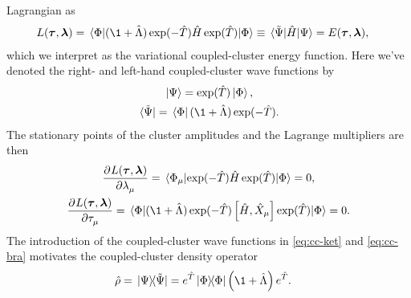             Lagrangian as
            \begin{align}
                L(\vfg{\clustamp}, \vfg{\clustlamp})
                &= \mel*{\slat}{
                    (\1 + \clustl)
                    \exponential(-\clust)
                    \hamil
                    \exponential(\clust)
                }{\slat}
                \equiv \mel*{\tilde{\Psi}}{\hamil}{\Psi}
                = E(\vfg{\clustamp}, \vfg{\clustlamp}),
                \label{eq:cc-energy-functional}
            \end{align}
            which we interpret as the variational coupled-cluster energy
            function.
            Here we've denoted the right- and left-hand coupled-cluster wave
            functions by
            \begin{gather}
                \ket*{\Psi} = \exponential(\clust)\ket{\slat},
                \label{eq:cc-ket}
                \\
                \bra*{\tilde{\Psi}} = \bra*{\slat}(\1 + \clustl)
                \exponential(-\clust).
                \label{eq:cc-bra}
            \end{gather}
            The stationary points of the cluster amplitudes and the Lagrange
            multipliers are then
            \begin{gather}
                \dpd[]{L(\vfg{\clustamp}, \vfg{\clustlamp})}
                {\clustlamp_{\mu}}
                = \mel*{\slat_{\mu}}{
                    \exponential(-\clust)
                    \hamil
                    \exponential(\clust)
                }{\slat}
                = 0,
                \label{eq:cc-lagrangian-tau}
                \\
                \dpd[]{L(\vfg{\clustamp}, \vfg{\clustlamp})}
                {\clustamp_{\mu}}
                = \mel*{\slat}{
                    (\1 + \clustl)
                    \exponential(-\clust)
                    \com{\hamil}{\hat{X}_{\mu}}
                    \exponential(\clust)
                }{\slat}
                \label{eq:cc-lagrangian-lambda}
                = 0.
            \end{gather}
            The introduction of the coupled-cluster wave functions in
            \autoref{eq:cc-ket} and \autoref{eq:cc-bra} motivates the
            coupled-cluster density operator \cite{kvaal2013variational}
            \begin{align}
                \density
                &= \dyad*{\Psi}{\tilde{\Psi}}
                = e^{\clust}\dyad{\slat}{\slat}\para{\1 + \clustl}e^{\clust}.
                \label{eq:cc-density-operator}
            \end{align}
